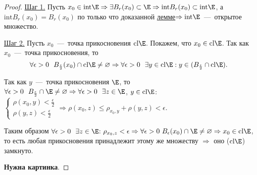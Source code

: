 \begin{proof}
    \underline{Шаг 1.} Пусть $x_{0} \in \text{int}\E \Rightarrow \exists B_{r} (x_{0}) \subset \E \Rightarrow \text{int}B_{r} (x_{0}) \subset \text{int}\E$, а $\text{int}B_{r} (x_{0}) = B_{r} (x_{0})$ по только что доказанной \hyperlink{lemm7.1}{лемме}$\Rightarrow \text{int}\E$~---~открытое множество.

    \underline{Шаг 2.} Пусть $x_{0}$~---~точка прикосновения $\text{cl}\E$. Покажем, что $x_{0} \in \text{cl}\E$. Так как $x_{0}$~---~точка прикосновения, то
    $$ \forall \epsilon > 0 \ \ B_{\frac{\epsilon}{2}} (x_{0}) \cap \text{cl}\E \neq \varnothing \Rightarrow \forall \epsilon > 0 \ \ \exists y \in \text{cl}\E: y \in (B_{\frac{\epsilon}{2}} \cap \text{cl}\E).$$

    Так как $y$~---~точка прикосновения $\E$, то $\forall \epsilon > 0 \ \ B_{\frac{\epsilon}{2}} \cap \E \neq \varnothing \Rightarrow \forall \epsilon > 0 \ \ \exists z \in \E$, $y \in \text{cl}\E$: 
    $\begin{cases}
        \rho(x_{0}, y) < \frac{\epsilon}{2} \\
        \rho(y, z) < \frac{\epsilon}{2}
    \end{cases} \Rightarrow \rho(x_{0}, z) \leq \rho_{x_{0}, y} + \rho(y, z) < \epsilon$.

    Таким образом $\forall \epsilon > 0 \ \ \exists z \in \E$: $\rho_{x_{0}, z} < \epsilon \Rightarrow \forall \epsilon > 0 \ B_{\epsilon} (x_{0}) \cap \E \neq \varnothing \Rightarrow x_{0} \in \text{cl}\E$, то есть любая прикосновения принадлежит этому же множеству $\Rightarrow$ оно ($\text{cl}\E$) замкнуто.

    \textbf{Нужна картинка}.
\end{proof}